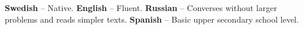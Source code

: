 
\begin{myindentpar}
  \textbf{Swedish} -- Native.\quad
  \textbf{English} -- Fluent.\quad
  \textbf{Russian} -- Converses without larger problems and reads simpler texts.\quad
  \textbf{Spanish} -- Basic upper secondary school level.
\end{myindentpar}
